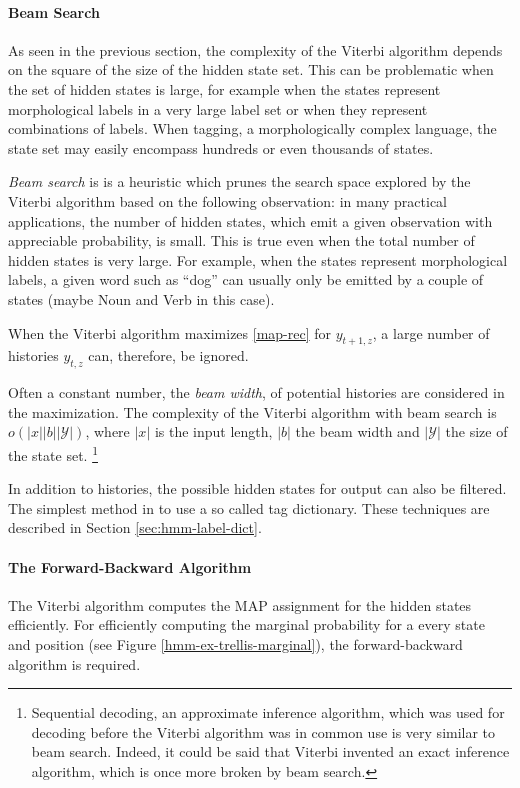 \paragraph{Beam Search}
As seen in the previous section, the complexity of the Viterbi
algorithm depends on the square of the size of the hidden state
set. This can be problematic when the set of hidden states is large,
for example when the states represent morphological labels in a very large label
set or when they represent combinations of labels. When tagging, a
morphologically complex language, the state set may easily encompass
hundreds or even thousands of states.

{\it Beam search} is is a heuristic which prunes the search space
explored by the Viterbi algorithm based on the following observation:
in many practical applications, the number of hidden states, which emit
a given observation with appreciable probability, is small. This is
true even when the total number of hidden states is very large. For
example, when the states represent morphological labels, a given word such as
``dog'' can usually only be emitted by a couple of states (maybe Noun
and Verb in this case).

When the Viterbi algorithm maximizes \eqref{map-rec} for $y_{t+1,z}$,
a large number of histories $y_{t,z}$ can, therefore, be ignored.

Often a constant number, the {\it beam width}, of potential histories
are considered in the maximization. The complexity of the Viterbi
algorithm with beam search is $o(|x||b||\mathcal{Y}|)$, where $|x|$ is the input length, $|b|$ the beam width and $|\mathcal{Y}|$ the size of the state set.
\footnote{Sequential decoding, an approximate inference
  algorithm, which was used for decoding before the Viterbi algorithm
  was in common use \citep{Forney2005} is very similar to beam
  search. Indeed, it could be said that Viterbi invented an exact
  inference algorithm, which is once more broken by beam search.}

In addition to histories, the possible hidden states for output can
also be filtered. The simplest method in to use a so called tag
dictionary. These techniques are described in Section
\ref{sec:hmm-label-dict}.

\paragraph{The Forward-Backward Algorithm}
\label{hmm-fw-bw}
The Viterbi algorithm computes the MAP assignment for the hidden
states efficiently. For efficiently computing the marginal probability
for a every state and position (see Figure
\ref{hmm-ex-trellis-marginal}), the forward-backward algorithm is
required.

